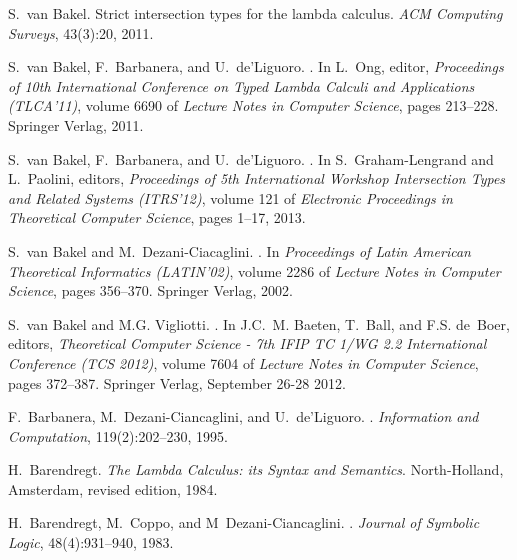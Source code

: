 \documentclass{lmcs}
\begin{document}
\begin{thebibliography}{10}
S.~van Bakel.
\newblock Strict intersection types for the lambda calculus.
\newblock \emph{{ACM} Computing Surveys}, 43(3):20, 2011.

S.~van Bakel, F.~Barbanera, and U.~de'Liguoro.
.
\newblock In L.~Ong, editor, \emph{{Proceedings of \emph{10th International
 Conference on Typed Lambda Calculi and Applications} (TLCA'11)}}, volume 6690
 of \emph{Lecture Notes in Computer Science}, pages 213--228. Springer Verlag,
 2011.

S.~van Bakel, F.~Barbanera, and U.~de'Liguoro.
.
\newblock In S.~Graham-Lengrand and L.~Paolini, editors, \emph{{Proceedings of
 5th International Workshop \emph{Intersection Types and Related Systems}
 (ITRS'12)}}, volume 121 of \emph{Electronic Proceedings in Theoretical
 Computer Science}, pages 1--17, 2013.

S.~van Bakel and M.~Dezani-Ciacaglini.
.
\newblock In \emph{Proceedings of Latin American Theoretical Informatics
 (LATIN'02)}, volume 2286 of \emph{Lecture Notes in Computer Science}, pages
 356--370. Springer Verlag, 2002.

S.~van Bakel and {M.G.} Vigliotti.
.
\newblock In J.C.~M. Baeten, T.~Ball, and F.S. de~Boer, editors, {\em
 Theoretical Computer Science - 7th IFIP TC 1/WG 2.2 International Conference
 (TCS 2012)}, volume 7604 of \emph{Lecture Notes in Computer Science}, pages
 372--387. Springer Verlag, September 26-28 2012.

F.~Barbanera, M.~{Dezani-Ciancaglini}, and U.~{de'Liguoro}.
.
\newblock \emph{Information and Computation}, 119(2):202--230, 1995.

H.~Barendregt.
\newblock \emph{{The Lambda Calculus: its Syntax and Semantics}}.
\newblock North-Holland, Amsterdam, revised edition, 1984.

H.~Barendregt, M.~Coppo, and M~{Dezani-Ciancaglini}.
.
\newblock \emph{Journal of Symbolic Logic}, 48(4):931--940, 1983.


\end{thebibliography}
\end{document}

